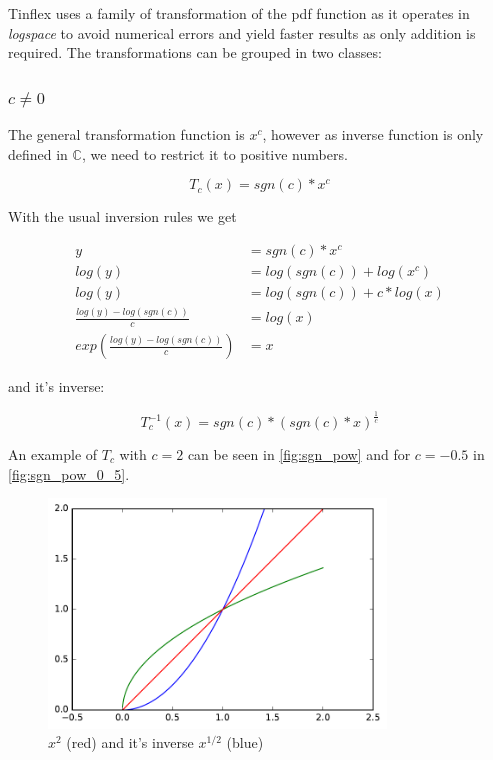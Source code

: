 \documentclass[]{article}
\begin{document}
Tinflex uses a family of transformation of the pdf function as it operates in \textit{logspace} to avoid numerical errors and yield faster results as only addition is required. The transformations can be grouped in two classes:

\subsubsection{$c \neq 0$}

The general transformation function is $x^c$, however as inverse function is only defined in $\mathbb{C}$, we need to restrict it to positive numbers.

\[T_c(x) = sgn(c) * x^c\]

With the usual inversion rules we get

\begin{align*}
y &= sgn(c) * x^c \\
log(y) &= log(sgn(c)) + log(x^c) \\
log(y) &= log(sgn(c)) + c * log(x) \\
\frac{log(y) - log(sgn(c))}{c} &= log(x) \\
exp\left(\frac{log(y) - log(sgn(c))}{c}\right) &= x
\end{align*}

and it's inverse:

\[T_c^{-1}(x) = sgn(c) * (sgn(c) * x)^{\frac{1}{c}}\]

An example of $T_c$ with $c = 2$ can be seen in \autoref{fig:sgn_pow} and for $c = -0.5$ in \autoref{fig:sgn_pow_0_5}.

\begin{figure}[h!]
\centering
\includegraphics[width=0.8\textwidth]{figs/a_2_sgn_pow.pdf}
\caption{$x^2$ (red) and it's inverse $x^{1/2}$ (blue)}
\label{fig:sgn_pow}
\end{figure}
\end{document}

